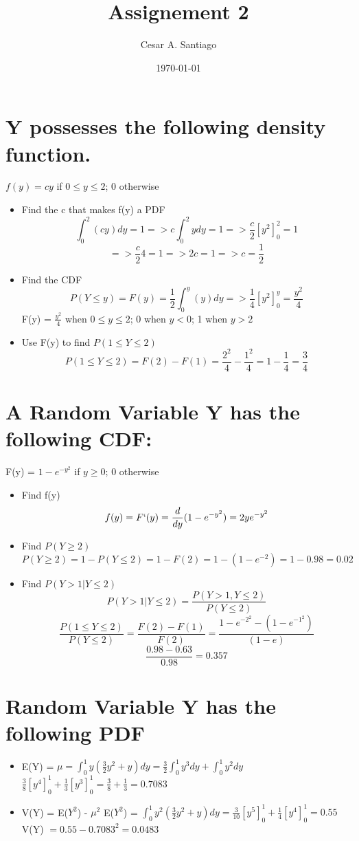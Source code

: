 \documentclass[a4paper, 12pt]{article}
\begin{document}
\title{Assignement 2}
\author{Cesar A. Santiago}
\date{\today}
\maketitle

\tableofcontents
\newpage
{}

\section {Y possesses the following density function.}
$f(y) = cy$  if $0 \leq y \leq 2$; $0$ otherwise
\begin{itemize}
\item Find the c that makes f(y) a PDF
	$$\int_0^2 (cy)dy = 1 => c\int_0^2 ydy = 1 => \frac{c}{2} [y^2]_0^2 = 1$$
	$$=> \frac{c}{2}4 = 1 => 2c = 1 => c = \frac{1}{2}$$
\item Find the CDF
$$P(Y \leq y) = F(y) = \frac{1}{2}\int_0^y (y)dy => \frac{1}{4}[y^2]_0^y = \frac{y^2}{4}$$
F(y) = $\frac{y^2}{4}$ when $0 \leq y \leq 2$; 0 when $y < 0$; 1 when $y > 2$
\item Use F(y) to find $P(1 \leq Y \leq 2)$
$$P(1 \leq Y \leq 2)  = F(2) - F(1) = \frac{2^2}{4} - \frac{1^2}{4} = 1 - \frac{1}{4} = \frac{3}{4}$$
\end{itemize}

\section {A Random Variable Y has the following CDF:}
F(y) = $1-e^{-y^2}$ if $y \geq 0$; 0 otherwise
\begin{itemize}
\item Find f(y)
$$f(y) = F`(y) = \frac{d}{dy}(1-e^{-y^2}) = 2ye^{-y^2}$$
\item Find $P(Y \geq 2)$
$$P(Y \geq 2) = 1 - P(Y \leq 2) = 1 - F(2) = 1 - (1 - e^{-2}) = 1 - 0.98 = 0.02$$
\item Find $P(Y > 1 | Y \leq 2)$
$$P(Y > 1|Y\leq 2) = \frac{P(Y > 1, Y \leq 2)}{P(Y \leq 2)}$$
$$\frac{P(1\leq Y \leq 2)}{P(Y \leq 2)} = \frac{F(2) - F(1)}{F(2)} = \frac{1-e^{-2^2} - (1 - e^{-1^2})}{(1-e)}$$
$$\frac{0.98 - 0.63}{0.98} = 0.357$$
\end{itemize}

\section {Random Variable Y has the following PDF}
\begin{itemize}
\item E(Y) = $\mu = \int_0^1y(\frac{3}{2}y^2 + y)dy = \frac{3}{2}\int_0^1y^3dy + \int_0^1y^2dy$\newline
\newline $\frac{3}{8}[y^4]_0^1+\frac{1}{3}[y^3]_0^1 = \frac{3}{8} + \frac{1}{3} = 0.7083$
\item V(Y) = E($Y^2$) - $\mu^2$
\newline E($Y^2$) = $\int_0^1 y^2(\frac{3}{2}y^2 + y)dy = \frac{3}{10}[y^5]_0^1 + \frac{1}{4}[y^4]_0^1 = 0.55$\newline
V(Y) $= 0.55 - 0.7083^2 = 0.0483$
\end{itemize}
\end{document}
